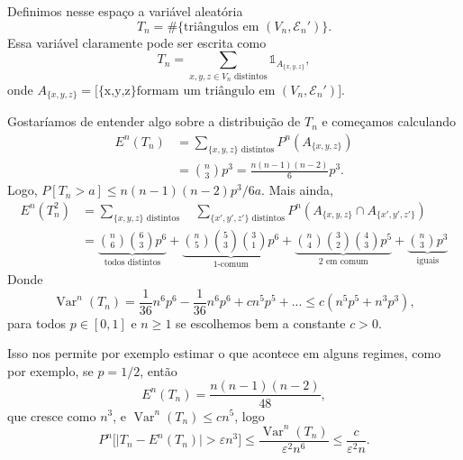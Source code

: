\documentclass[reqno]{article}
\newcommand*\1{\mathds{1}}
\DeclareMathOperator{\Var}{Var}
\begin{document}
Definimos nesse espaço a variável aleatória
\begin{equation}
  T_n = \#\big\{\text{triângulos em $(V_n, \mathcal{E}_n')$}\big\}.
\end{equation}
Essa variável claramente pode ser escrita como
\begin{equation}
  T_n = \sum_{x,y,z \in V_n \text{ distintos}} \1_{A_{\{x,y,z\}}},
\end{equation}
onde $A_{\{x,y,z\}} = \big[\text{\{x,y,z\} formam um triângulo em $(V_n, \mathcal{E}_n')$}\big]$.

Gostaríamos de entender algo sobre a distribuição de $T_n$ e começamos calculando
\begin{equation}
  \begin{split}
    E^n(T_n) & = \sum_{\{x,y,z\} \text{ distintos}} P^n(A_{\{x,y,z\}})\\
    & = \binom{n}{3} p^3 = \frac{n(n-1)(n-2)}{6}p^3.
  \end{split}
\end{equation}
Logo, $P[T_n > a] \leq n(n-1)(n-2)p^3/6a$.
Mais ainda,
\begin{equation}
  \begin{split}
    E^n(T_n^2) & = \sum_{\{x,y,z\} \text{ distintos}} \quad \sum_{\{x',y',z'\} \text{ distintos}} P^n(A_{\{x,y,z\}} \cap A_{\{x',y',z'\}})\\
    & = \underbrace{\binom{n}{6} \binom{6}{3} p^6}_{\text{todos distintos}} + \underbrace{\binom{n}{5} \binom{5}{3} \binom{3}{1} p^6}_{\text{$1$-comum}} + \underbrace{\binom{n}{4} \binom{3}{2} \binom{4}{3} p^5}_{\text{$2$ em comum}} + \underbrace{\binom{n}{3}p^3}_{\text{iguais}}
  \end{split}
\end{equation}
Donde
\begin{equation}
  \Var^n(T_n) = \frac{1}{36} n^6 p^6 - \frac{1}{36} n^6 p^6 + c n^5 p^5 + ... \leq c (n^5 p^5 + n^3 p^3),
\end{equation}
para todos $p \in [0,1]$ e $n \geq 1$ se escolhemos bem a constante $c > 0$.

Isso nos permite por exemplo estimar o que acontece em alguns regimes, como por exemplo, se $p = 1/2$, então
\begin{equation}
  E^n(T_n) = \frac{n(n-1)(n-2)}{48},
\end{equation}
que cresce como $n^3$, e $\Var^n(T_n) \leq c n^5$, logo
\begin{equation}
  P^n\Big[ \Big|T_n - E^n(T_n)\Big| > \varepsilon n^3 \Big] \leq \frac{\Var^n(T_n)}{\varepsilon^2 n^6} \leq \frac{c}{\varepsilon^2 n}.
\end{equation}
\end{document}
